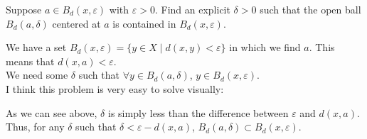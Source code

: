 \documentclass[11pt]{article}
\begin{document}
\pagebreak

\begin{homeworkProblem}
    Suppose $a \in B_d (x, \varepsilon)$ with $\varepsilon > 0$. Find an explicit $\delta > 0$ such that the open ball
    $B_d(a, \delta)$ centered at $a$ is contained in $B_d(x, \varepsilon)$. \vspace{1\baselineskip}

    \solution

    We have a set $B_d(x, \varepsilon) = \{y \in X \mid d(x, y) < \varepsilon\}$ in which we find $a$. This means that $d(x, a) < \varepsilon$. \\

    We need some $\delta$ such that $\forall y \in B_d(a, \delta)$, $y \in B_d(x, \varepsilon)$. \\

    I think this problem is very easy to solve visually:

    \begin{figure}[h!]
        \centering
    \end{figure}
    As we can see above, $\delta$ is simply less than the difference between $\varepsilon$ and $d(x, a)$.
    Thus, for any $\delta$ such that $\delta < \varepsilon - d(x, a)$, $B_d(a, \delta) \subset B_d(x, \varepsilon)$.
\end{homeworkProblem}

\pagebreak
\end{document}
